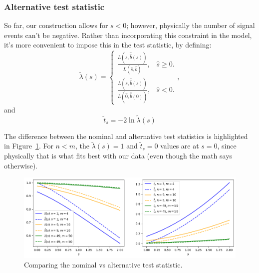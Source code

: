 
\subsubsection{Alternative test statistic}

So far, our construction allows for $s < 0$; however, physically the number of signal events can't be negative.
Rather than incorporating this constraint in the model, it's more convenient to impose this in the test statistic, by defining:
\begin{equation}
    \tilde{\lambda}(s) = \left\{
    \begin{array}{ll}
      \frac{L(s, \hat{\hat{b}}(s))}{L(\hat{s}, \hat{b})}, & \mbox{$\hat{s}\geq0$}.\\
      \frac{L(s, \hat{\hat{b}}(s))}{L(\hat{0}, \hat{\hat{b}}(0))}, & \mbox{$\hat{s}<0$}.
    \end{array}
  \right.,
\label{eq:03_lambda_tilde}
\end{equation}
and
\begin{equation}
    \tilde{t}_s = -2\ln \tilde{\lambda}(s)
\label{eq:03_t_tilde}
\end{equation}

The difference between the nominal and alternative test statistics is highlighted in Figure~\ref{fig:03_alt_ts}.
For $n < m$, the $\tilde{\lambda}(s) = 1$ and $\tilde{t}_s = 0$ values are at $s = 0$, since physically that is what fits best with our data (even though the math says otherwise).

\begin{figure}[htb]
\centering
\includegraphics[width=\textwidth]{figures/03-Stats/01-intro/4.png}
\captionsetup{justification=centering}
\caption{Comparing the nominal vs alternative test statistic.}
\label{fig:03_alt_ts}
\end{figure}

